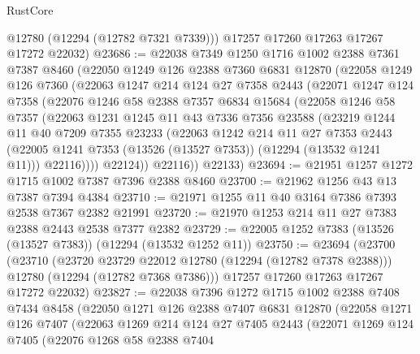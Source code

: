 \begin{lexlean}{RustCore}
\begin{coremodule}
        @12780
        (@12294 (@12782 @7321 @7339)))
      @17257
      @17260
      @17263
      @17267
      @17272
      @22032)
@23686 := @22038
    @7349
    @1250
    @1716
    @1002
    @2388
    @7361
    @7387
    @8460
    (@22050
      @1249
      @126
      @2388
      @7360
      @6831
      @12870
      (@22058
        @1249
        @126
        @7360
        (@22063
          @1247
          @214
          @124
          @27
          @7358
          @2443
          (@22071
            @1247
            @124
            @7358
            (@22076
              @1246
              @58
              @2388
              @7357
              @6834
              @15684
              (@22058
                @1246
                @58
                @7357
                (@22063
                  @1231
                  @1245
                  @11
                  @43
                  @7336
                  @7356
                  @23588
                  (@23219
                    @1244
                    @11
                    @40
                    @7209
                    @7355
                    @23233
                    (@22063
                      @1242
                      @214
                      @11
                      @27
                      @7353
                      @2443
                      (@22005 @1241 @7353 (@13526 (@13527 @7353)) (@12294 (@13532 @1241 @11)))
                      @22116))))
              @22124))
          @22116))
      @22133)
@23694 := @21951 @1257 @1272 @1715 @1002 @7387 @7396 @2388 @8460
@23700 := @21962 @1256 @43 @13 @7387 @7394 @4384
@23710 := @21971 @1255 @11 @40 @3164 @7386 @7393 @2538 @7367 @2382 @21991
@23720 := @21970 @1253 @214 @11 @27 @7383 @2388 @2443 @2538 @7377 @2382
@23729 := @22005 @1252 @7383 (@13526 (@13527 @7383)) (@12294 (@13532 @1252 @11))
@23750 := @23694
    (@23700
      (@23710
        (@23720 @23729 @22012 @12780 (@12294 (@12782 @7378 @2388)))
        @12780
        (@12294 (@12782 @7368 @7386)))
      @17257
      @17260
      @17263
      @17267
      @17272
      @22032)
@23827 := @22038
    @7396
    @1272
    @1715
    @1002
    @2388
    @7408
    @7434
    @8458
    (@22050
      @1271
      @126
      @2388
      @7407
      @6831
      @12870
      (@22058
        @1271
        @126
        @7407
        (@22063
          @1269
          @214
          @124
          @27
          @7405
          @2443
          (@22071
            @1269
            @124
            @7405
            (@22076
              @1268
              @58
              @2388
              @7404

\end{coremodule}
\end{lexlean}
